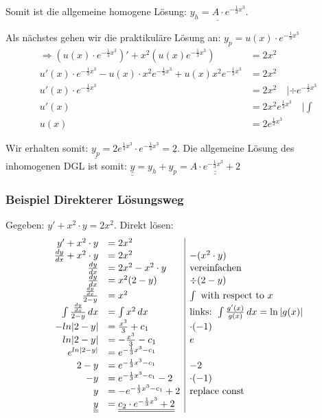 Somit ist die allgemeine homogene Lösung: $\underline{y_h = A \cdot e^{-\frac{1}{3}x^3}}$.


Als nächstes gehen wir die praktikuläre Lösung an:
$y_p = u(x) \cdot e^{-\frac{1}{3}x^3}$
\begin{align*}
\Rightarrow (u(x) \cdot e^{-\frac{1}{3}x^3})' + x^2 (u(x) e^{-\frac{1}{3}x^3}) &= 2 x^2\\
u'(x) \cdot e^{-\frac{1}{3}x^3} - u(x) \cdot x^2 e^{-\frac{1}{3}x^3} + u(x) x^2 e^{-\frac{1}{3}x^3} &= 2 x^2\\
u'(x) \cdot e^{-\frac{1}{3}x^3} &= 2 x^2 \quad | \div e^{-\frac{1}{3}x^3}\\
u'(x) &= 2 x^2 e^{\frac{1}{3}x^3} \quad | \int\\
u(x) &= 2 e^{\frac{1}{3}x^3}
\end{align*}

Wir erhalten somit: $\underline{y_p} = 2 e^{\frac{1}{3}x^3} \cdot e^{-\frac{1}{3}x^3} = \underline{2}$.
Die allgemeine Lösung des inhomogenen DGL ist somit:
$\underline{\underline{y}} = y_h + y_p = \underline{\underline{A \cdot e^{-\frac{1}{3}x^3} + 2}}$


\subsubsection{Beispiel Direkterer Lösungsweg}
Gegeben: $y' + x^2 \cdot y = 2x^2$.
Direkt lösen:
\begin{equation*}
\begin{array}{r l |l}
y' + x^2 \cdot y &= 2x^2\\
\frac{dy}{dx} + x^2 \cdot y &= 2x^2 \quad & -(x^2 \cdot y)\\
\frac{dy}{dx} &= 2x^2 -x^2 \cdot y \quad & \text{vereinfachen}\\
\frac{dy}{dx} &= x^2 ( 2 - y) \quad & \div (2 - y) \\
\frac{\frac{dy}{dx}}{2 - y} &= x^2  & \int \text{ with respect to } x \\
\int \frac{\frac{dy}{dx}}{2 - y}  \, dx &= \int x^2 \, dx & \text{links: } \int \frac{g'(x)}{g(x)} \, dx = \ln|g(x)|\\ 
- ln |2 - y| &= \frac{x^3}{3} + c_1 & \cdot (-1) \\
ln |2 - y| &= - \frac{x^3}{3} - c_1 & e \\
e^{ln |2 - y|} &= e^{-\frac{1}{3}x^3 - c_1 } \\
2 - y &= e^{-\frac{1}{3}x^3 - c_1 }& - 2 \\
- y &= e^{-\frac{1}{3}x^3 - c_1 } - 2 & \cdot (-1)\\
y &= - e^{-\frac{1}{3}x^3 - c_1 } + 2 & \text{replace const} \\
\underline{\underline{y}} &= \underline{\underline{c_2 \cdot e^{-\frac{1}{3}x^3} + 2}}\\
\end{array} 
\end{equation*}


